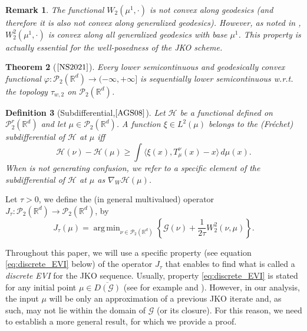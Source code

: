 \documentclass[11pt]{article}
\DeclareMathOperator*{\argmin}{arg\,min}
\newtheorem{theorem}{Theorem}[section]
\newtheorem{defi}[theorem]{Definition}
\newtheorem{remark}[theorem]{Remark}
\newcommand{\cP}{\mathcal{P}}
\newcommand{\cG}{\mathcal{G}}
\newcommand{\R}{\mathbb{R}}
\newcommand{\RR}{(-\infty,+\infty]}
\numberwithin{equation}{section}
\begin{document}
\begin{remark}
	The functional $W_2(\mu^1,\cdot)$ is not convex along geodesics (and therefore it is also not convex along generalized geodesics). However, as noted in \cite[Remark 9.2.8]{AGS08}, $W_2^2(\mu^1,\cdot)$ is convex along all generalized geodesics with base $\mu^1$. This property is actually essential for the well-posedness of the JKO scheme.
\end{remark}

\begin{theorem}[$\text{\cite[Theorem 4.2]{NS2021}}$]\label{thm:lsc_wlsc}
	Every lower semicontinuous and geodesically convex functional $
	\varphi : \mathcal{P}_2(\R^d) \to \RR$
	is sequentially lower semicontinuous w.r.t. the topology $\tau_{w,2}$ on $\mathcal{P}_2(\R^d)$.
\end{theorem}

\begin{defi}[Subdifferential,$\text{\cite[Section 10.1.1]{AGS08}}$] Let $\mathcal{H}$ be a functional defined on $\cP_2^r(\R^d)$ and let $\mu \in \cP_2(\R^d)$. A function $\xi \in L^2(\mu)$ belongs to the (Fréchet) subdifferential of $\mathcal{H}$ at $\mu$ iff
	\[\mathcal{H}(\nu)-\mathcal{H}(\mu)\geq \int \langle \xi (x), T_{\mu}^\nu(x)- x \rangle \, d\mu(x).\]
	When is not generating confusion, we refer to a specific element of the subdifferential of $\mathcal{H}$ at $\mu$ as $\nabla_W \mathcal{H}(\mu)$.
\end{defi}

Let $\tau > 0$, we define the (in general multivalued) operator $J_{\tau}: \cP_2(\R^d) \to \cP_2(\R^d)$, by
\begin{equation}\label{eq:prox}
	J_{\tau}(\mu) = \argmin_{\nu \in \cP_2(\R^d)} \left\{\cG(\nu) + \frac{1}{2\tau} W_2^2(\nu,\mu)\right\}.
\end{equation}

Throughout this paper, we will use a specific property (see equation \eqref{eq:discrete_EVI} below) of the operator $J_{\tau}$ that enables to find what is called a \emph{discrete EVI} for the JKO sequence. Usually, property \eqref{eq:discrete_EVI} is stated for any initial point $\mu \in \overline{D(\cG)}$ (see for example \cite[Lemma 9.2.7]{AGS08} and \cite[Theorem 4.1.2 (i) and (ii)]{AGS08}). However, in our analysis, the input $\mu$ will be only an approximation of a previous JKO iterate and, as such, may not lie within the domain of $\cG$ (or its closure). For this reason, we need to establish a more general result, for which we provide a proof.
\end{document}
